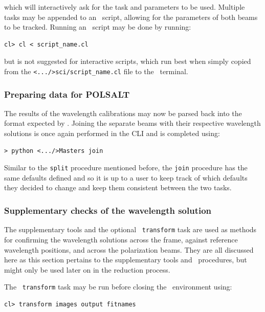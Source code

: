 \noindent which will interactively ask for the task and parameters to be used. Multiple tasks may be appended to an \iraf\ script, allowing for the parameters of both beams to be tracked. Running an \iraf\ script may be done by running:

\begin{verbatim}cl> cl < script_name.cl\end{verbatim}

\noindent but is not suggested for interactive scripts, which run best when simply copied from the \texttt{<.../>sci/script\_name.cl} file to the \iraf\ terminal.


\subsubsection{Preparing data for POLSALT}

The results of the wavelength calibrations may now be parsed back into the format expected by \polsalt. Joining the separate beams with their respective wavelength solutions is once again performed in the \gls{CLI} and is completed using:

\begin{verbatim}> python <.../>Masters join\end{verbatim}

Similar to the \texttt{split} procedure mentioned before, the \texttt{join} procedure has the same defaults defined and so it is up to a user to keep track of which defaults they decided to change and keep them consistent between the two tasks.


\subsubsection{Supplementary checks of the wavelength solution}

The supplementary tools and the optional \iraf\ \texttt{transform} task are used as methods for confirming the wavelength solutions across the frame, against reference wavelength positions, and across the polarization beams. They are all discussed here as this section pertains to the supplementary tools and \iraf\ procedures, but might only be used later on in the reduction process.
\prgph

The \iraf\ \texttt{transform} task may be run before closing the \iraf\ environment using:

\begin{verbatim}cl> transform images output fitnames\end{verbatim}

